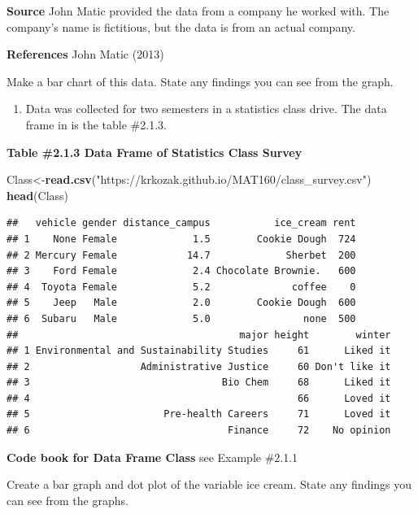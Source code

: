 \documentclass[
]{book}
\newenvironment{Shaded}{\begin{snugshade}}{\end{snugshade}}
\newcommand{\KeywordTok}[1]{\textcolor[rgb]{0.13,0.29,0.53}{\textbf{#1}}}
\newcommand{\NormalTok}[1]{#1}
\newcommand{\StringTok}[1]{\textcolor[rgb]{0.31,0.60,0.02}{#1}}
\providecommand{\tightlist}{%
  \setlength{\itemsep}{0pt}\setlength{\parskip}{0pt}}
\begin{document}
\textbf{Source}
John Matic provided the data from a company he worked with. The company's name is fictitious, but the data is from an actual company.

\textbf{References}
John Matic (2013)

Make a bar chart of this data. State any findings you can see from the graph.

\begin{enumerate}
\def\labelenumi{\arabic{enumi}.}
\setcounter{enumi}{1}
\tightlist
\item
  Data was collected for two semesters in a statistics class drive. The data frame in is the table \#2.1.3.
\end{enumerate}

\textbf{Table \#2.1.3 Data Frame of Statistics Class Survey}

\begin{Shaded}
\begin{Highlighting}[]
\NormalTok{Class<-}\KeywordTok{read.csv}\NormalTok{(}\StringTok{"https://krkozak.github.io/MAT160/class_survey.csv"}\NormalTok{)}
\KeywordTok{head}\NormalTok{(Class)}
\end{Highlighting}
\end{Shaded}

\begin{verbatim}
##   vehicle gender distance_campus           ice_cream rent
## 1    None Female             1.5        Cookie Dough  724
## 2 Mercury Female            14.7             Sherbet  200
## 3    Ford Female             2.4 Chocolate Brownie.   600
## 4  Toyota Female             5.2              coffee    0
## 5    Jeep   Male             2.0        Cookie Dough  600
## 6  Subaru   Male             5.0                none  500
##                                      major height        winter
## 1 Environmental and Sustainability Studies     61      Liked it
## 2                   Administrative Justice     60 Don't like it
## 3                                 Bio Chem     68      Liked it
## 4                                              66      Loved it
## 5                       Pre-health Careers     71      Loved it
## 6                                  Finance     72    No opinion
\end{verbatim}

\textbf{Code book for Data Frame Class} see Example \#2.1.1

Create a bar graph and dot plot of the variable ice cream. State any findings you can see from the graphs.
\end{document}
